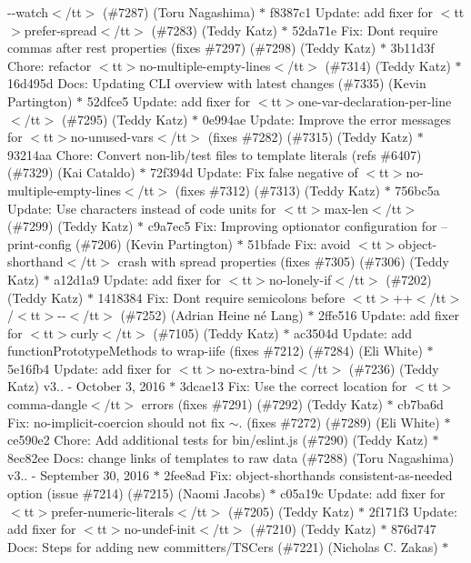 \begin{DoxyItemize}
-\/-\/watch$<$/tt$>$ (\#7287) (\+Toru Nagashima) \texorpdfstring{$\ast$}{*} f8387c1 Update\+: add fixer for $<$tt$>$prefer-\/spread$<$/tt$>$ (\#7283) (\+Teddy Katz) \texorpdfstring{$\ast$}{*} 52da71e Fix\+: Don\textquotesingle{}t require commas after rest properties (fixes \#7297) (\#7298) (\+Teddy Katz) \texorpdfstring{$\ast$}{*} 3b11d3f Chore\+: refactor $<$tt$>$no-\/multiple-\/empty-\/lines$<$/tt$>$ (\#7314) (\+Teddy Katz) \texorpdfstring{$\ast$}{*} 16d495d Docs\+: Updating CLI overview with latest changes (\#7335) (\+Kevin Partington) \texorpdfstring{$\ast$}{*} 52dfce5 Update\+: add fixer for $<$tt$>$one-\/var-\/declaration-\/per-\/line$<$/tt$>$ (\#7295) (\+Teddy Katz) \texorpdfstring{$\ast$}{*} 0e994ae Update\+: Improve the error messages for $<$tt$>$no-\/unused-\/vars$<$/tt$>$ (fixes \#7282) (\#7315) (\+Teddy Katz) \texorpdfstring{$\ast$}{*} 93214aa Chore\+: Convert non-\/lib/test files to template literals (refs \#6407) (\#7329) (\+Kai Cataldo) \texorpdfstring{$\ast$}{*} 72f394d Update\+: Fix false negative of $<$tt$>$no-\/multiple-\/empty-\/lines$<$/tt$>$ (fixes \#7312) (\#7313) (\+Teddy Katz) \texorpdfstring{$\ast$}{*} 756bc5a Update\+: Use characters instead of code units for $<$tt$>$max-\/len$<$/tt$>$ (\#7299) (\+Teddy Katz) \texorpdfstring{$\ast$}{*} c9a7ec5 Fix\+: Improving optionator configuration for --print-\/config (\#7206) (\+Kevin Partington) \texorpdfstring{$\ast$}{*} 51bfade Fix\+: avoid $<$tt$>$object-\/shorthand$<$/tt$>$ crash with spread properties (fixes \#7305) (\#7306) (\+Teddy Katz) \texorpdfstring{$\ast$}{*} a12d1a9 Update\+: add fixer for $<$tt$>$no-\/lonely-\/if$<$/tt$>$ (\#7202) (\+Teddy Katz) \texorpdfstring{$\ast$}{*} 1418384 Fix\+: Don\textquotesingle{}t require semicolons before $<$tt$>$++$<$/tt$>$/$<$tt$>$-\/-\/$<$/tt$>$ (\#7252) (\+Adrian Heine né Lang) \texorpdfstring{$\ast$}{*} 2ffe516 Update\+: add fixer for $<$tt$>$curly$<$/tt$>$ (\#7105) (\+Teddy Katz) \texorpdfstring{$\ast$}{*} ac3504d Update\+: add function\+Prototype\+Methods to wrap-\/iife (fixes \#7212) (\#7284) (\+Eli White) \texorpdfstring{$\ast$}{*} 5e16fb4 Update\+: add fixer for $<$tt$>$no-\/extra-\/bind$<$/tt$>$ (\#7236) (\+Teddy Katz)  v3.. -\/ October 3, 2016  \texorpdfstring{$\ast$}{*} 3dcae13 Fix\+: Use the correct location for $<$tt$>$comma-\/dangle$<$/tt$>$ errors (fixes \#7291) (\#7292) (\+Teddy Katz) \texorpdfstring{$\ast$}{*} cb7ba6d Fix\+: no-\/implicit-\/coercion should not fix \texorpdfstring{$\sim$}{\string~}. (fixes \#7272) (\#7289) (\+Eli White) \texorpdfstring{$\ast$}{*} ce590e2 Chore\+: Add additional tests for bin/eslint.\+js (\#7290) (\+Teddy Katz) \texorpdfstring{$\ast$}{*} 8ec82ee Docs\+: change links of templates to raw data (\#7288) (\+Toru Nagashima)  v3.. -\/ September 30, 2016  \texorpdfstring{$\ast$}{*} 2fee8ad Fix\+: object-\/shorthand\textquotesingle{}s consistent-\/as-\/needed option (issue \#7214) (\#7215) (\+Naomi Jacobs) \texorpdfstring{$\ast$}{*} c05a19c Update\+: add fixer for $<$tt$>$prefer-\/numeric-\/literals$<$/tt$>$ (\#7205) (\+Teddy Katz) \texorpdfstring{$\ast$}{*} 2f171f3 Update\+: add fixer for $<$tt$>$no-\/undef-\/init$<$/tt$>$ (\#7210) (\+Teddy Katz) \texorpdfstring{$\ast$}{*} 876d747 Docs\+: Steps for adding new committers/\+TSCers (\#7221) (\+Nicholas C. Zakas) \texorpdfstring{$\ast$}{*} 
\end{DoxyItemize}
